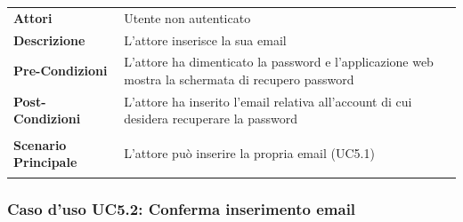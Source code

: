 \begin{minipage}{\linewidth}
\begin{longtable}{ l | p{11cm}}
	\hline
	\rowcolor{Gray}
	 \multicolumn{2}{c}{UC5.1 - Inserimento email} \\
	 \hline
	\textbf{Attori} & Utente non autenticato \\
	\textbf{Descrizione} & L'attore inserisce la sua email \\
	\textbf{Pre-Condizioni} & L'attore ha dimenticato la password e l'applicazione web mostra la schermata di recupero password \\
	\textbf{Post-Condizioni} & L'attore ha inserito l'email relativa all'account di cui desidera recuperare la password \\
	\textbf{Scenario Principale} & \begin{enumerate*}[label=(\arabic*.),itemjoin={\newline}]
		\item L'attore può inserire la propria email (UC5.1)
	\end{enumerate*}\\
\end{longtable}
\end{minipage}

\subsubsection{Caso d'uso UC5.2: Conferma inserimento email}
\label{UC5_2}

